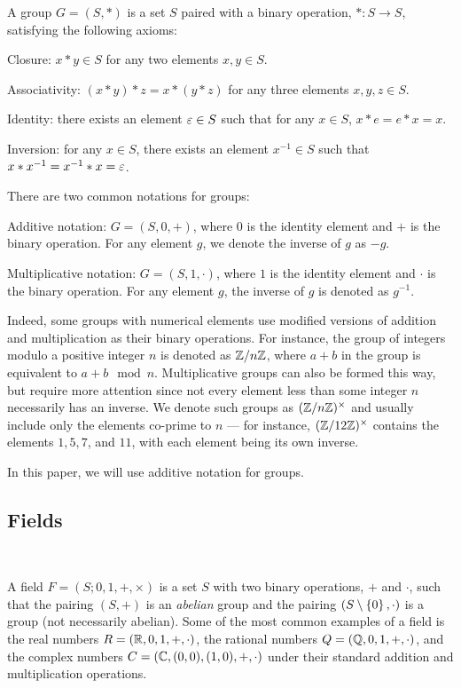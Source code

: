 A group $G = (S, \ast)$ is a set $S$ paired with a binary operation,
$\ast : S \to S$, satisfying the following axioms:
\begin{enumroman}
  \item Closure: $x \ast y \in S$ for any two elements $x, y \in S$.
  \item Associativity: $(x \ast y) \ast z = x \ast (y \ast z)$
    for any three elements $x, y, z \in S$.
  \item Identity: there exists an element $\varepsilon \in S$ such that
    for any $x \in S$, $x \ast e = e \ast x = x$.
  \item Inversion: for any $x \in S$, there exists an element
    $x^{-1} \in S$ such that $x \ast x^{-1} = x^{-1} \ast x = \varepsilon$.
\end{enumroman}
There are two common notations for groups:
\begin{enumroman}
  \item Additive notation: $G = (S, 0, +)$, where $0$ is the identity
    element and $+$ is the binary operation.
    For any element $g$, we denote the inverse of $g$ as $-g$.
  \item Multiplicative notation: $G = (S, 1, \cdot)$, where $1$ is the
    identity element and $\cdot$ is the binary operation.
    For any element $g$, the inverse of $g$ is denoted as $g^{-1}$.
\end{enumroman}

Indeed, some groups with numerical elements use modified versions of
addition and multiplication as their binary operations.
For instance, the group of integers modulo a positive integer $n$
is denoted as $\mathbb{Z}/n\mathbb{Z}$, where $a + b$ in the group is equivalent
to $a + b \mod n$.
Multiplicative groups can also be formed this way, but require
more attention since not every element less than some integer $n$
necessarily has an inverse. We denote such groups as $(\mathbb{Z}/n\mathbb{Z})^\times$
and usually include only the elements co-prime to $n$ ---
for instance, $(\mathbb{Z}/12\mathbb{Z})^\times$ contains the elements $1, 5, 7$, and $11$,
with each element being its own inverse.

In this paper, we will use additive notation for groups.

\subsection{Fields}~\label{sec:def-fields}

A field $F = (S; 0, 1, +, \times)$ is a set $S$ with two binary operations, $+$ and $\cdot$,
such that the pairing $(S, +)$ is an \emph{abelian} group
and the pairing $(S \setminus \left\{ 0 \right\}, \cdot)$ is a 
group (not necessarily abelian). Some of the most common examples of a field
is the real numbers $R = (\mathbb{R}, 0, 1, +, \cdot)$, the rational numbers $Q = (\mathbb{Q}, 0, 1, +, \cdot)$,
and the complex numbers $C = (\mathbb{C}, (0, 0), (1, 0), +, \cdot)$
under their standard addition and multiplication
operations.


